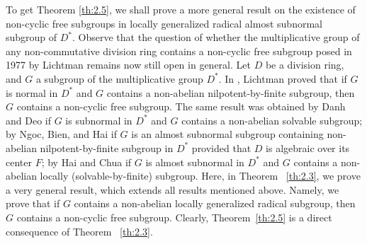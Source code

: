 \documentclass{amsart}
\theoremstyle{definition}
\begin{document}
To get Theorem \ref{th:2.5}, we shall prove a more general result on the existence of non-cyclic free subgroups in  locally 
generalized radical almost subnormal subgroup of $D^*$.
Observe that the question of whether the multiplicative group of any non-commutative division ring contains a non-cyclic free subgroup posed in 1977 by Lichtman \cite{Pa_Li_77} remains now still open in general. Let $D$ be a division ring, and $G$ a subgroup of the multiplicative group $D^*$. In \cite[Theorem 2]{Pa_Li_78}, Lichtman proved that if $G$ is normal in $D^*$  and $G$ contains a non-abelian nilpotent-by-finite subgroup, then $G$ contains a non-cyclic free subgroup. The same result was obtained by Danh and Deo \cite[Theorem~1.2]{Pa_Danh-Deo_2023} if $G$ is subnormal in $D^*$ and $G$ contains a non-abelian solvable subgroup; by Ngoc, Bien, and Hai \cite[Theorem 4.7]{Pa_nbh_17} if $G$ is an almost subnormal subgroup {\color{blue}containing non-abelian nilpotent-by-finite subgroup} in $D^*$ provided that $D$ is algebraic over its center $F$; by Hai and Chua \cite[Theorem 3.5]{Pa_HaiChua_2025} if $G$ is almost subnormal in $D^*$ and $G$ contains a non-abelian locally (solvable-by-finite) subgroup. Here, in Theorem~ \ref{th:2.3}, we prove a very general result, which extends all results mentioned above. Namely, we prove that if $G$ contains a non-abelian locally generalized radical subgroup, then $G$ contains a non-cyclic free subgroup. Clearly, Theorem~\ref{th:2.5} is a direct consequence of Theorem~ \ref{th:2.3}. 
\end{document}
